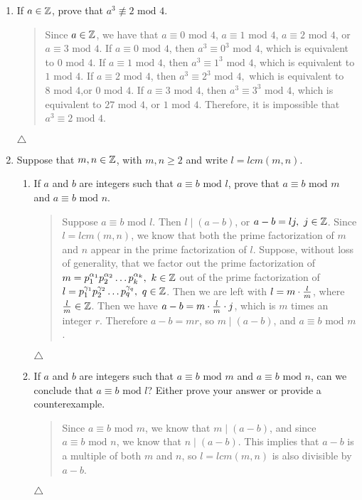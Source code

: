\documentclass{hw}
\begin{document}
\begin{enumerate}
\item If $a\in\mathbb{Z}$, prove that $a^3\not\equiv2\text{ mod }4$.
\begin{quote}
Since $a\in\mathbb{Z}$, we have that $a\equiv0\text{ mod }4$, $a\equiv1\text{ mod }4$, $a\equiv2\text{ mod }4$, or
$a\equiv3\text{ mod }4$.
If $a\equiv0\text{ mod }4$, then $a^3\equiv0^3\text{ mod }4$, which is equivalent to $0\text{ mod }4$.
If $a\equiv1\text{ mod }4$, then $a^3\equiv1^3\text{ mod }4$, which is equivalent to $1\text{ mod }4$.
If $a\equiv2\text{ mod }4$, then $a^3\equiv2^3\text{ mod }4,$ which is equivalent to
$8\text{ mod }4$,or $0\text{ mod }4$.
If $a\equiv3\text{ mod }4$, then $a^3\equiv3^3\text{ mod }4$, which is equivalent to
$27\text{ mod }4$, or $1\text{ mod }4$.
Therefore, it is impossible that $a^3\equiv2\text{ mod }4$.
\end{quote}
$\triangle$

\item Suppose that $m,n\in\mathbb{Z}$, with $m,n\geq2$ and write $l=lcm(m,n)$.
\begin{enumerate}
\item If $a$ and $b$ are integers such that $a\equiv b\text{ mod }l$, prove that
$a\equiv b\text{ mod }m$ and $a\equiv b\text{ mod }n$.
\begin{quote}
Suppose $a\equiv b\text{ mod }l$. Then $l\mid(a-b)$, or $a-b=lj,\ j\in\mathbb{Z}$. Since $l=lcm(m,n)$, we know that
both the prime factorization of $m$ and $n$ appear in the prime factorization of $l$. Suppose, without loss
of generality, that we factor out the prime factorization of
$m=p_{1}^{\alpha_{1}}p_{2}^{\alpha_{2}}\dots p_{k}^{\alpha_{k}},\ k\in\mathbb{Z}$ out of the prime factorization of
$l = p_{1}^{\gamma_{1}}p_{2}^{\gamma_{2}}\dots p_{q}^{\gamma_{q}},\ q\in\mathbb{Z}$. Then we are left with
$l=m\cdot{l\over m}$, where ${l\over m}\in\mathbb{Z}$. Then we have $a-b=m\cdot{l\over m}\cdot j$, which is $m$
times an integer $r$. Therefore $a-b=mr$, so $m\mid(a-b)$, and $a\equiv b\text{ mod }m$.
\end{quote}
$\triangle$

\item If $a$ and $b$ are integers such that $a\equiv b\text{ mod }m$ and $a\equiv b\text{ mod }n$, can
we conclude that $a\equiv b\text{ mod }l$? Either prove your answer or provide a counterexample.
\begin{quote}
Since $a\equiv b\text{ mod }m$, we know that $m\mid (a-b)$, and since $a\equiv b\text{ mod }n$, we know
that $n\mid (a-b)$. This implies that $a-b$ is a multiple of both $m$ and $n$, so $l=lcm(m,n)$ is
also divisible by $a-b$.
\end{quote}
$\triangle$
\end{enumerate}


\end{enumerate}
\end{document}
